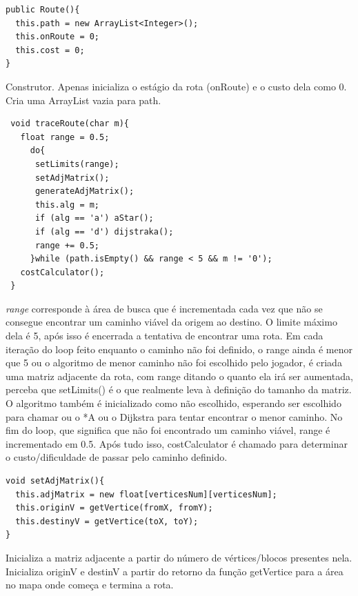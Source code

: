 \documentclass[
	12pt,				%
	oneside,			%
	a4paper,			%
	english,			%
	brazil,				%
	]{abntex2}
\begin{document}
{

\begin{lstlisting}
public Route(){
  this.path = new ArrayList<Integer>();
  this.onRoute = 0;
  this.cost = 0;
}
\end{lstlisting}

Construtor. Apenas inicializa o estágio da rota (onRoute) e o custo dela como 0. Cria uma ArrayList vazia para path.

\begin{lstlisting}
 void traceRoute(char m){
   float range = 0.5;
     do{
      setLimits(range);
      setAdjMatrix();
      generateAdjMatrix();
      this.alg = m;
      if (alg == 'a') aStar();
      if (alg == 'd') dijstraka();
      range += 0.5;
     }while (path.isEmpty() && range < 5 && m != '0');
   costCalculator();
 }
\end{lstlisting}

\textit{range} corresponde à área de busca que é incrementada cada vez que não se consegue encontrar um caminho viável da origem ao destino. O limite máximo dela é 5, após isso é encerrada a tentativa de encontrar uma rota. Em cada iteração do loop feito enquanto o caminho não foi definido, o range ainda é menor que 5 ou o algoritmo de menor caminho não foi escolhido pelo jogador, é criada uma matriz adjacente da rota, com range ditando o quanto ela irá ser aumentada, perceba que setLimits() é o que realmente leva à definição do tamanho da matriz. O algoritmo também é inicializado como não escolhido, esperando ser escolhido para chamar ou o *A ou o Dijkstra para tentar encontrar o menor caminho. No fim do loop, que significa que não foi encontrado um caminho viável, range é incrementado em 0.5. Após tudo isso, costCalculator é chamado para determinar o custo/dificuldade de passar pelo caminho definido.


\begin{lstlisting}
void setAdjMatrix(){
  this.adjMatrix = new float[verticesNum][verticesNum];
  this.originV = getVertice(fromX, fromY);
  this.destinyV = getVertice(toX, toY);
}
\end{lstlisting}

Inicializa a matriz adjacente a partir do número de vértices/blocos presentes nela. Inicializa originV e destinV a partir do retorno da função getVertice para a área no mapa onde começa e termina a rota.


}
\end{document}
